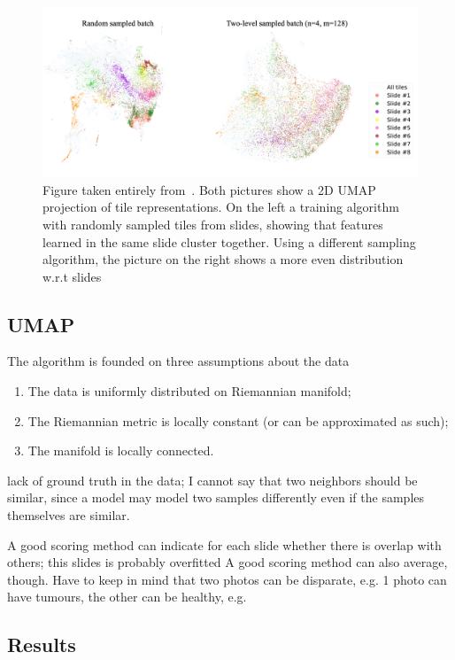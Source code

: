\documentclass[10pt,twocolumn,letterpaper]{article}
\begin{document}
\begin{figure}
  \includegraphics[scale=.17]{./umap.png}
  \caption{Figure taken entirely from~\cite{sslUMAP}. Both pictures show a 2D \gls{UMAP} projection of tile representations. On the left a training algorithm with randomly sampled tiles from slides, showing that features learned in the same slide cluster together. Using a different sampling algorithm, the picture on the right shows a more even distribution w.r.t slides}
  \label{fig:umap}
\end{figure}

\subsection{UMAP}
 The algorithm is founded on three assumptions about the data
 \begin{enumerate}
   \item The data is uniformly distributed on Riemannian manifold;
   \item The Riemannian metric is locally constant (or can be approximated as such);
   \item The manifold is locally connected.
 \end{enumerate}

lack of ground truth in the data; I cannot say that two neighbors should be similar, since a model may model two samples differently even if the samples themselves are similar.

A good scoring method can indicate for each slide whether there is overlap with others; this slides is probably overfitted
A good scoring method can also average, though.
Have to keep in mind that two photos can be disparate, e.g. 1 photo can have tumours, the other can be healthy, e.g.

\subsection{Results}\label{sec:results}
\end{document}
